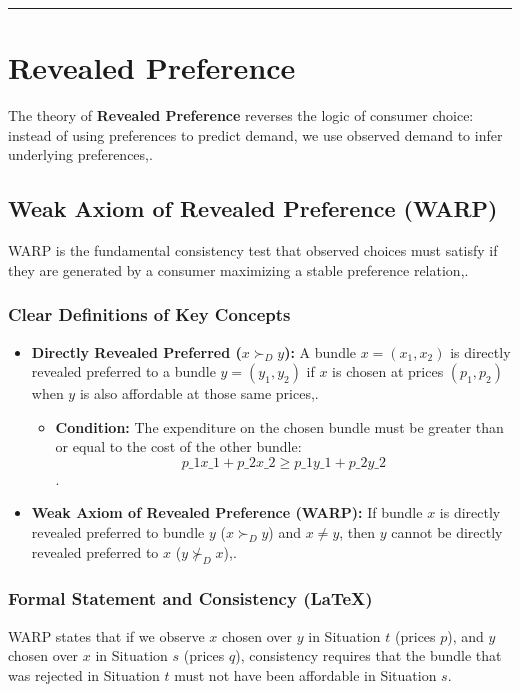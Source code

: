 \documentclass{article}
\begin{document}
\hrule

\section{Revealed Preference}

The theory of \textbf{Revealed Preference} reverses the logic of consumer choice: instead of using preferences to predict demand, we use observed demand to infer underlying preferences,.

\subsection{Weak Axiom of Revealed Preference (WARP)}

WARP is the fundamental consistency test that observed choices must satisfy if they are generated by a consumer maximizing a stable preference relation,.

\subsubsection*{Clear Definitions of Key Concepts}
\begin{itemize}
    \item \textbf{Directly Revealed Preferred ($x \succ_D y$):} A bundle $x = (x_1, x_2)$ is directly revealed preferred to a bundle $y = (y_1, y_2)$ if $x$ is chosen at prices $(p_1, p_2)$ when $y$ is also affordable at those same prices,.
    \begin{itemize}
        \item \textbf{Condition:} The expenditure on the chosen bundle must be greater than or equal to the cost of the other bundle: \[p\_1 x\_1 + p\_2 x\_2 \geq p\_1 y\_1 + p\_2 y\_2\].
    \end{itemize}
    \item \textbf{Weak Axiom of Revealed Preference (WARP):} If bundle $x$ is directly revealed preferred to bundle $y$ ($x \succ_D y$) and $x \neq y$, then $y$ cannot be directly revealed preferred to $x$ ($y \not\succ_D x$),.
\end{itemize}

\subsubsection*{Formal Statement and Consistency (LaTeX)}

WARP states that if we observe $x$ chosen over $y$ in Situation $t$ (prices $p$), and $y$ chosen over $x$ in Situation $s$ (prices $q$), consistency requires that the bundle that was rejected in Situation $t$ must not have been affordable in Situation $s$.
\end{document}
